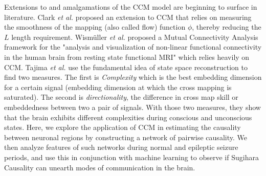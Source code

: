 Extensions to and amalgamations of the CCM model are beginning to surface in literature. Clark \textit{et al.} proposed an extension to CCM that relies on measuring the smoothness of the mapping (also called flow) function $\phi$, thereby reducing the $L$ length requirement\cite{Clark2015}.  Wismüller \textit{et al.} proposed a Mutual Connectivity Analysis framework for the "analysis and visualization of non-linear functional connectivity in the human brain from resting state functional MRI" \cite{wismuller2014} which relies heavily on CCM. Tajima \textit{\textit{et al.}} use the fundamental idea of state space reconstruction to find two measures. The first is \textit{Complexity} which is the best embedding dimension for a certain signal (embedding dimension at which the cross mapping is saturated). The second is \textit{directionality}, the difference in cross map skill or embeddedness between two a pair of signals. With those two measures, they show that the brain exhibits different complexities during conscious and unconscious states. Here, we explore the application of CCM in estimating the causality between neuronal regions by constructing a network of pairwise causality. We then analyze features of such networks during normal and epileptic seizure periods, and use this in conjunction with machine learning to observe if Sugihara Causality can unearth modes of communication in the brain.

